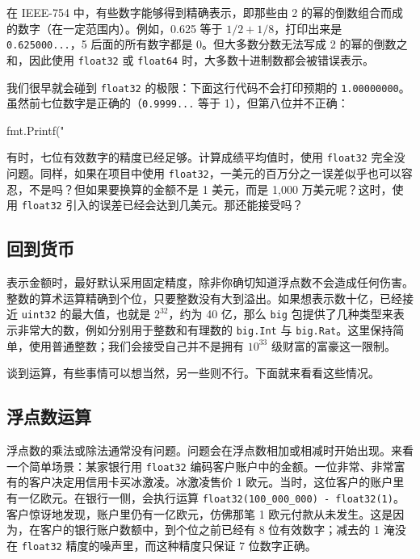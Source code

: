 在 IEEE-754 中，有些数字能够得到精确表示，即那些由 2 的幂的倒数组合而成的数字（在一定范围内）。例如，0.625 等于 $1/2 + 1/8$，打印出来是 \texttt{0.625000...}，5 后面的所有数字都是 0。但大多数分数无法写成 2 的幂的倒数之和，因此使用 \texttt{float32} 或 \texttt{float64} 时，大多数十进制数都会被错误表示。

我们很早就会碰到 \texttt{float32} 的极限：下面这行代码不会打印预期的 \texttt{1.00000000}。虽然前七位数字是正确的（\texttt{0.9999...} 等于 1），但第八位并不正确：

\begin{gocode}[]
fmt.Printf("%
\end{gocode}

有时，七位有效数字的精度已经足够。计算成绩平均值时，使用 \texttt{float32} 完全没问题。同样，如果在项目中使用 \texttt{float32}，一美元的百万分之一误差似乎也可以容忍，不是吗？但如果要换算的金额不是 1 美元，而是 1,000 万美元呢？这时，使用 \texttt{float32} 引入的误差已经会达到几美元。那还能接受吗？

\subsection{回到货币}

表示金额时，最好默认采用固定精度，除非你确切知道浮点数不会造成任何伤害。整数的算术运算精确到个位，只要整数没有大到溢出。如果想表示数十亿，已经接近 \texttt{uint32} 的最大值，也就是 $2^{32}$，约为 40 亿，那么 \texttt{big} 包提供了几种类型来表示非常大的数，例如分别用于整数和有理数的 \texttt{big.Int} 与 \texttt{big.Rat}。这里保持简单，使用普通整数；我们会接受自己并不是拥有 $10^{33}$ 级财富的富豪这一限制。

谈到运算，有些事情可以想当然，另一些则不行。下面就来看看这些情况。

\subsection{浮点数运算}

浮点数的乘法或除法通常没有问题。问题会在浮点数相加或相减时开始出现。来看一个简单场景：某家银行用 \texttt{float32} 编码客户账户中的金额。一位非常、非常富有的客户决定用信用卡买冰激凌。冰激凌售价 1 欧元。当时，这位客户的账户里有一亿欧元。在银行一侧，会执行运算 \texttt{float32(100\_000\_000) - float32(1)}。客户惊讶地发现，账户里仍有一亿欧元，仿佛那笔 1 欧元付款从未发生。这是因为，在客户的银行账户数额中，到个位之前已经有 8 位有效数字；减去的 1 淹没在 \texttt{float32} 精度的噪声里，而这种精度只保证 7 位数字正确。

